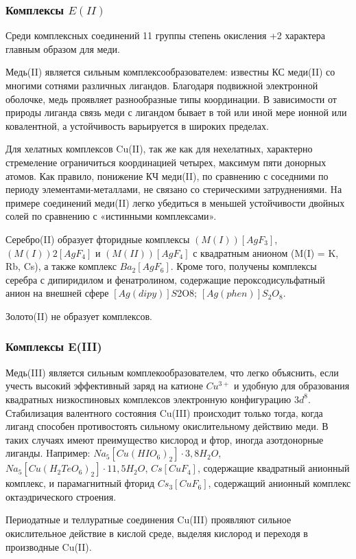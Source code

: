 \documentclass[11pt]{article}
\begin{document}
\subsubsection{Комплексы $E(II)$}

Среди комплексных соединений 11 группы степень окисления +2 характера
главным образом для меди.

Медь(II) является сильным комплексообразователем: известны КС меди(II) со
многими сотнями различных лигандов. Благодаря подвижной электронной оболочке, медь
проявляет разнообразные типы координации. В зависимости от природы лиганда связь
меди с лигандом бывает в той или иной мере ионной или ковалентной, а устойчивость
варьируется в широких пределах.

Для хелатных комплексов Cu(II), так же как для нехелатных, характерно стремеление
ограничиться координацией четырех, максимум пяти донорных атомов.
Как правило, понижение КЧ меди(II), по сравнению с соседними по периоду
элементами-металлами, не связано со стерическими затруднениями. Hа примере
соединений меди(II) легко убедиться в меньшей устойчивости двойных солей по
сравнению с «истинными комплексами».

Серебро(II) образует фторидные комплексы $(M(I))[AgF_3]$, $(M(I))2[AgF_4]$ и
$(M(II))[AgF_4]$ с квадратным анионом (M(I) = K, Rb, Cs), а также комплекс $Ba_2[AgF_6]$. Кроме
того, получены комплексы серебра с дипиридилом и фенатролином, содержащие
пероксодисульфатный анион на внешней сфере $[Ag(dipy)]S$2O$8$; $[Ag(phen)]S_2O_8$.

Золото(II) не образует комплексов.

\subsubsection{Комплексы E(III)}
Медь(III) является сильным комплекообразователем, что легко объяснить, если
учесть высокий эффективный заряд на катионе $Cu^{3+}$ и удобную для образования
квадратных низкоспиновых комплексов электронную конфигурацию $3d^8$. Стабилизация
валентного состояния Cu(III) происходит только тогда, когда лиганд способен
противостоять сильному окислительному действию меди. 
В таких случаях имеют
преимущество кислород и фтор, иногда азотдонорные лиганды. Hапример:
$Na_5[Cu(HIO_6)_2]\cdot3,8H_2O$, $Na_5[Cu(H_2TeO_6)_2]\cdot11,5H_2O$, $Cs[CuF_4]$, содержащие квадратный анионный комплекс, и парамагнитный фторид $Cs_3[CuF_6]$, содержащий анионный комплекс
октаэдрического строения. 

Периодатные и теллуратные соединения Cu(III) проявляют
сильное окислительное действие в кислой среде, выделяя кислород и переходя в
производные Cu(II).
\end{document}
